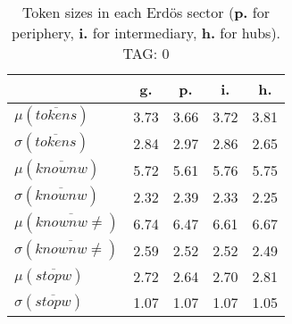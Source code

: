 \begin{table}[h!]
\begin{center}
\begin{tabular}{| l || c | c | c | c |}\hline
 & {\bf g.} & {\bf p.} & {\bf i.} & {\bf h.} \\\hline\hline
$\mu(\overline{tokens})$ & 3.73  & 3.66  & 3.72  & 3.81 \\
$\sigma(\overline{tokens})$ & 2.84  & 2.97  & 2.86  & 2.65 \\\hline
$\mu(\overline{knownw})$ & 5.72  & 5.61  & 5.76  & 5.75 \\
$\sigma(\overline{knownw})$ & 2.32  & 2.39  & 2.33  & 2.25 \\\hline
$\mu(\overline{knownw \neq})$ & 6.74  & 6.47  & 6.61  & 6.67 \\
$\sigma(\overline{knownw \neq})$ & 2.59  & 2.52  & 2.52  & 2.49 \\\hline
$\mu(\overline{stopw})$ & 2.72  & 2.64  & 2.70  & 2.81 \\
$\sigma(\overline{stopw})$ & 1.07  & 1.07  & 1.07  & 1.05 \\\hline
\end{tabular}
\caption{Token sizes in each Erd\"os sector ({{\bf p.}} for periphery, {{\bf i.}} for intermediary, {{\bf h.}} for hubs). TAG: 0}
\end{center}
\end{table}